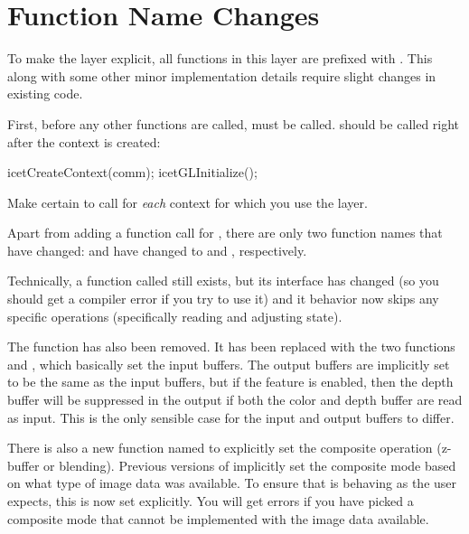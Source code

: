 \section{Function Name Changes}
\label{sec:Transitioning:Function_Name_Changes}

To make the \OpenGL layer explicit, all functions in this layer are prefixed
with .  This along with some other minor implementation
details require slight changes in existing code.

First, before any other  functions are called,
 must be called.   should
be called right after the context is created:
\begin{code}
icetCreateContext(comm);
icetGLInitialize();
\end{code}

Make certain to call  for \emph{each} context for
which you use the \OpenGL layer.

Apart from adding a function call for , there are
only two function names that have changed:
 and  have
changed to  and ,
respectively.

Technically, a function called  still exists, but its
interface has changed (so you should get a compiler error if you try to use
it) and it behavior now skips any \OpenGL specific operations (specifically
reading and adjusting \OpenGL state).

The function 
has also been removed.  It has been replaced with the two functions
 and , which basically
set the input buffers.  The output buffers are implicitly set to be the
same as the input buffers, but if the 
feature is enabled, then the depth buffer will be suppressed in the output
if both the color and depth buffer are read as input.  This is the only
sensible case for the input and output buffers to differ.

There is also a new function named  to explicitly
set the composite operation (z-buffer or blending).  Previous versions of
\IceT implicitly set the composite mode based on what type of image data
was available.  To ensure that \IceT is behaving as the user expects, this
is now set explicitly.  You will get errors if you have picked a composite
mode that cannot be implemented with the image data available.

